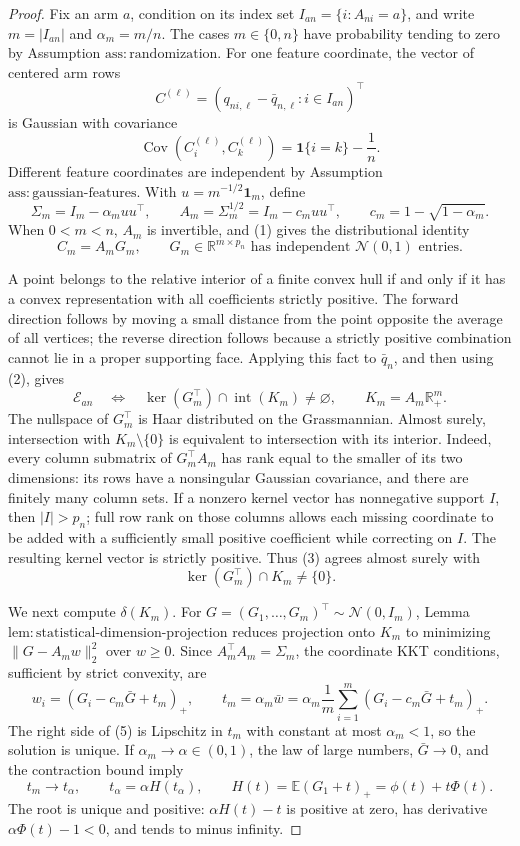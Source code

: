 \documentclass{article}
\begin{document}
\begin{proof}
Fix an arm \(a\), condition on its index set \(I_{an}=\{i:A_{ni}=a\}\), and write \(m=|I_{an}|\) and \(\alpha_m=m/n\).  The cases \(m\in\{0,n\}\) have probability tending to zero by Assumption \(\mathrm{ass{:}randomization}\).  For one feature coordinate, the vector of centered arm rows
\[
 C^{(\ell)}=(q_{ni,\ell}-\bar q_{n,\ell}:i\in I_{an})^\top
\]
is Gaussian with covariance
\[
 \operatorname{Cov}(C^{(\ell)}_i,C^{(\ell)}_k)
 =\mathbf1\{i=k\}-\frac1n.
 \tag{1}
\]
Different feature coordinates are independent by Assumption \(\mathrm{ass{:}gaussian\mbox{-}features}\).  With \(u=m^{-1/2}\mathbf1_m\), define
\[
 \Sigma_m=I_m-\alpha_muu^\top,
 \qquad
 A_m=\Sigma_m^{1/2}=I_m-c_muu^\top,
 \qquad
 c_m=1-\sqrt{1-\alpha_m}.
\]
When \(0<m<n\), \(A_m\) is invertible, and (1) gives the distributional identity
\[
 C_m=A_mG_m,
 \qquad G_m\in\mathbb R^{m\times p_n}
 \text{ has independent }\mathcal N(0,1)\text{ entries}.
 \tag{2}
\]

A point belongs to the relative interior of a finite convex hull if and only if it has a convex representation with all coefficients strictly positive.  The forward direction follows by moving a small distance from the point opposite the average of all vertices; the reverse direction follows because a strictly positive combination cannot lie in a proper supporting face.  Applying this fact to \(\bar q_n\), and then using (2), gives
\[
 \mathcal E_{an}
 \quad\Longleftrightarrow\quad
 \ker(G_m^\top)\cap\operatorname{int}(K_m)\ne\varnothing,
 \qquad K_m=A_m\mathbb R_+^m.
 \tag{3}
\]
The nullspace of \(G_m^\top\) is Haar distributed on the Grassmannian.  Almost surely, intersection with \(K_m\setminus\{0\}\) is equivalent to intersection with its interior.  Indeed, every column submatrix of \(G_m^\top A_m\) has rank equal to the smaller of its two dimensions: its rows have a nonsingular Gaussian covariance, and there are finitely many column sets.  If a nonzero kernel vector has nonnegative support \(I\), then \(|I|>p_n\); full row rank on those columns allows each missing coordinate to be added with a sufficiently small positive coefficient while correcting on \(I\).  The resulting kernel vector is strictly positive.  Thus (3) agrees almost surely with
\[
 \ker(G_m^\top)\cap K_m\ne\{0\}.
 \tag{4}
\]

We next compute \(\delta(K_m)\).  For \(G=(G_1,\ldots,G_m)^\top\sim\mathcal N(0,I_m)\), Lemma \(\mathrm{lem{:}statistical\mbox{-}dimension\mbox{-}projection}\) reduces projection onto \(K_m\) to minimizing \(\|G-A_mw\|_2^2\) over \(w\ge0\).  Since \(A_m^\top A_m=\Sigma_m\), the coordinate KKT conditions, sufficient by strict convexity, are
\[
 w_i=(G_i-c_m\bar G+t_m)_+,
 \qquad
 t_m=\alpha_m\bar w
 =\alpha_m\frac1m\sum_{i=1}^m(G_i-c_m\bar G+t_m)_+.
 \tag{5}
\]
The right side of (5) is Lipschitz in \(t_m\) with constant at most \(\alpha_m<1\), so the solution is unique.  If \(\alpha_m\to\alpha\in(0,1)\), the law of large numbers, \(\bar G\to0\), and the contraction bound imply
\[
 t_m\longrightarrow t_\alpha,
 \qquad
 t_\alpha=\alpha H(t_\alpha),
 \qquad H(t)=\mathbb E(G_1+t)_+=\phi(t)+t\Phi(t).
 \tag{6}
\]
The root is unique and positive: \(\alpha H(t)-t\) is positive at zero, has derivative \(\alpha\Phi(t)-1<0\), and tends to minus infinity.


\end{proof}
\end{document}

